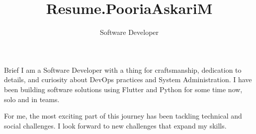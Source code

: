 \documentclass[
	a4paper, %
	12pt, %
]{resume} %
\title{Resume.PooriaAskariM}
\subtitle{Software Developer}  %
\begin{document}
\raggedright
\setlength{\headheight}{42pt} %
\setlength{\footskip}{10pt}  %



\begin{rSection}{Brief}
\bigskip
I am a Software Developer with a thing for craftsmanship, dedication to details, and curiosity about DevOps practices and System Administration. I have been building software solutions using Flutter and Python for some time now, solo and in teams. 
 
For me, the most exciting part of this journey has been tackling technical and social challenges. I look forward to new challenges that expand my skills.
\bigskip


\end{rSection}

\end{document}
